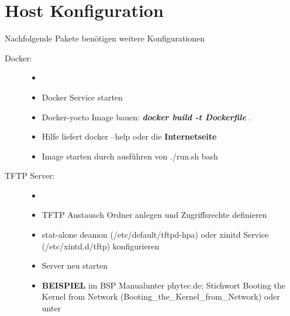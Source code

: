 \section{Host Konfiguration}%
\label{sec:host_konfiguration}

Nachfolgende Pakete benötigen weitere Konfigurationen
\begin{description}
    \item[Docker: ]
        \begin{itemize}
            \item[ ]
            \item Docker Service starten
            \item Docker-yocto Image bauen:
                \textbf{ \textit{docker build -t Dockerfile} }.
            \item Hilfe liefert docker --help oder die \textbf{Internetseite}
            \item Image starten durch ausführen von \glqq ./run.sh bash \grqq
        \end{itemize}

    \item[TFTP Server:]
        \begin{itemize}
            \item[ ]
            \item TFTP Austausch Ordner anlegen und Zugriffsrechte definieren
            \item stat-alone deamon (/etc/default/tftpd-hpa) oder xinitd Service
                (/etc/xintd.d/tftp) konfigurieren
            \item Server neu starten
            \item \textbf{BEISPIEL} im \glqq BSP Manual\grqq unter  phytec.de;
                    Stichwort \glqq Booting the Kernel from Network\grqq
                (Booting\_the\_Kernel\_from\_Network) \cite{Pytec:BSP_Manual}
                oder unter \cite[Seite
                44]{Gonzalez2018:Embedded_Linux_Development_Using_Yocto_Project_Cookbook_2nd}
        \end{itemize}


\end{description}
